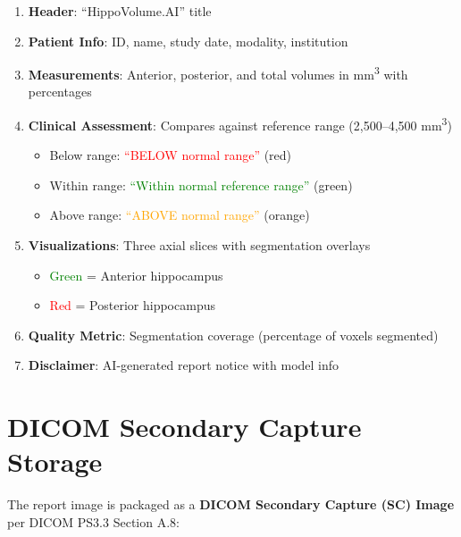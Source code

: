 \documentclass[12pt,a4paper]{report}
\begin{document}
\begin{enumerate}
    \item \textbf{Header}: ``HippoVolume.AI'' title
    \item \textbf{Patient Info}: ID, name, study date, modality, institution
    \item \textbf{Measurements}: Anterior, posterior, and total volumes in mm\textsuperscript{3} with percentages
    \item \textbf{Clinical Assessment}: Compares against reference range (2,500--4,500 mm\textsuperscript{3})
    \begin{itemize}
        \item Below range: \textcolor{red}{``BELOW normal range''} (red)
        \item Within range: \textcolor{green}{``Within normal reference range''} (green)
        \item Above range: \textcolor{orange}{``ABOVE normal range''} (orange)
    \end{itemize}
    \item \textbf{Visualizations}: Three axial slices with segmentation overlays
    \begin{itemize}
        \item \textcolor{green}{Green} = Anterior hippocampus
        \item \textcolor{red}{Red} = Posterior hippocampus
    \end{itemize}
    \item \textbf{Quality Metric}: Segmentation coverage (percentage of voxels segmented)
    \item \textbf{Disclaimer}: AI-generated report notice with model info
\end{enumerate}

\section{DICOM Secondary Capture Storage}

The report image is packaged as a \textbf{DICOM Secondary Capture (SC) Image} per DICOM PS3.3 Section A.8:
\end{document}
